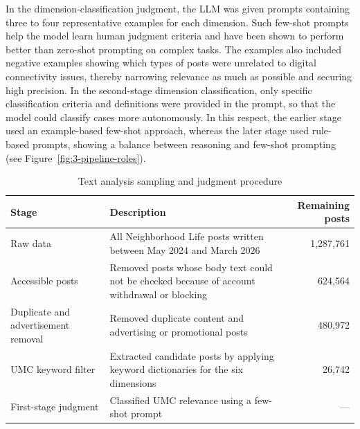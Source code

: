 In the dimension-classification judgment, the LLM was given prompts containing three to four representative examples for each dimension. Such few-shot prompts help the model learn human judgment criteria and have been shown to perform better than zero-shot prompting on complex tasks. The examples also included negative examples showing which types of posts were unrelated to digital connectivity issues, thereby narrowing relevance as much as possible and securing high precision. In the second-stage dimension classification, only specific classification criteria and definitions were provided in the prompt, so that the model could classify cases more autonomously. In this respect, the earlier stage used an example-based few-shot approach, whereas the later stage used rule-based prompts, showing a balance between reasoning and few-shot prompting (see Figure~\ref{fig:3-pipeline-roles}).

\begin{table}[htbp]
  \centering\small
  \caption{Text analysis sampling and judgment procedure}
  \label{tab:5-text-sample}
  \begin{tabularx}{\linewidth}{l Y r}
    \toprule
    \textbf{Stage} & \textbf{Description} & \textbf{Remaining posts} \\
    \midrule
    Raw data & All Neighborhood Life posts written between May 2024 and March 2026 & 1{,}287{,}761 \\
    Accessible posts & Removed posts whose body text could not be checked because of account withdrawal or blocking & 624{,}564 \\
    Duplicate and advertisement removal & Removed duplicate content and advertising or promotional posts & 480{,}972 \\
    UMC keyword filter & Extracted candidate posts by applying keyword dictionaries for the six dimensions & 26{,}742 \\
    First-stage judgment & Classified UMC relevance using a few-shot prompt & --- \\
    \bottomrule
  \end{tabularx}
\end{table}


